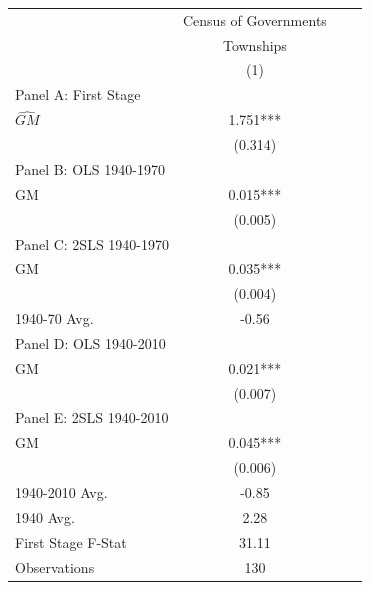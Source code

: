  \begin{tabular}{l*{3}{c}} \toprule
&\multicolumn{1}{c}{Census of Governments}\\\cmidrule(lr){2-2}
&\multicolumn{1}{c}{Townships}\\\cmidrule(lr){2-2}
&\multicolumn{1}{c}{(1)}\\
\cmidrule(lr){1-2}
\multicolumn{1}{l}{Panel A: First Stage}\\
\cmidrule(lr){1-2}
$\hat{GM}$      &    1.751***\\
                &  (0.314)   \\
\cmidrule(lr){1-2}
\multicolumn{1}{l}{Panel B: OLS 1940-1970}\\
\cmidrule(lr){1-2}
GM              &    0.015***\\
                &  (0.005)   \\
\cmidrule(lr){1-2}
\multicolumn{1}{l}{Panel C: 2SLS 1940-1970}\\
\cmidrule(lr){1-2}
GM              &    0.035***\\
                &  (0.004)   \\
\midrule
1940-70 Avg.    &    -0.56   \\
\cmidrule(lr){1-2}
\multicolumn{1}{l}{Panel D: OLS 1940-2010}\\
\cmidrule(lr){1-2}
GM              &    0.021***\\
                &  (0.007)   \\
\cmidrule(lr){1-2}
\multicolumn{1}{l}{Panel E: 2SLS 1940-2010}\\
\cmidrule(lr){1-2}
GM              &    0.045***\\
                &  (0.006)   \\
\midrule
1940-2010 Avg.  &    -0.85   \\
1940 Avg.       &     2.28   \\
First Stage F-Stat&    31.11   \\
Observations    &      130   \\
 \bottomrule \end{tabular}

